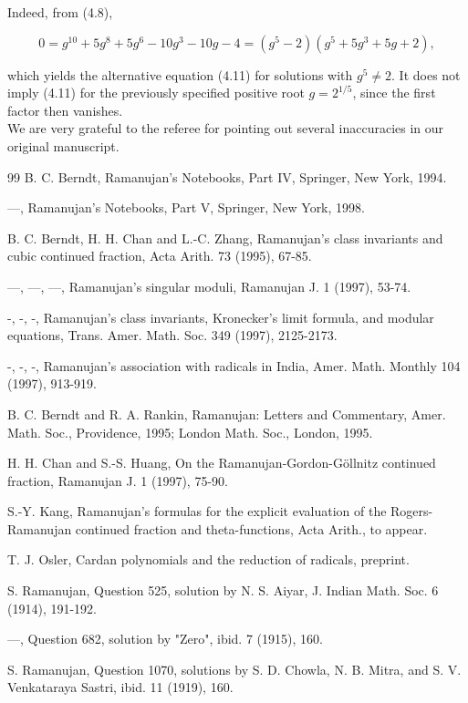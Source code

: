 \documentclass[11pt,letterpaper]{article}
\begin{document}
Indeed, from (4.8),

\[
0=g^{10}+5 g^{8}+5 g^{6}-10 g^{3}-10 g-4=\left(g^{5}-2\right)\left(g^{5}+5 g^{3}+5 g+2\right),
\]

which yields the alternative equation (4.11) for solutions with $g^5\ne2$. It does not imply (4.11) for the previously specified positive root $g=2^{1/5}$, since the first factor then vanishes.\\
We are very grateful to the referee for pointing out several inaccuracies in our original manuscript.

\begin{thebibliography}{99}
 B. C. Berndt, Ramanujan's Notebooks, Part IV, Springer, New York, 1994.

 —, Ramanujan's Notebooks, Part V, Springer, New York, 1998.

 B. C. Berndt, H. H. Chan and L.-C. Zhang, Ramanujan's class invariants and cubic continued fraction, Acta Arith. 73 (1995), 67-85.

 —, —, —, Ramanujan's singular moduli, Ramanujan J. 1 (1997), 53-74.

 -, -, -, Ramanujan's class invariants, Kronecker's limit formula, and modular equations, Trans. Amer. Math. Soc. 349 (1997), 2125-2173.

 -, -, -, Ramanujan's association with radicals in India, Amer. Math. Monthly 104 (1997), 913-919.

 B. C. Berndt and R. A. Rankin, Ramanujan: Letters and Commentary, Amer. Math. Soc., Providence, 1995; London Math. Soc., London, 1995.

 H. H. Chan and S.-S. Huang, On the Ramanujan-Gordon-Göllnitz continued fraction, Ramanujan J. 1 (1997), 75-90.

 S.-Y. Kang, Ramanujan's formulas for the explicit evaluation of the Rogers-Ramanujan continued fraction and theta-functions, Acta Arith., to appear.

 T. J. Osler, Cardan polynomials and the reduction of radicals, preprint.

 S. Ramanujan, Question 525, solution by N. S. Aiyar, J. Indian Math. Soc. 6 (1914), 191-192.

 —, Question 682, solution by "Zero", ibid. 7 (1915), 160.

 S. Ramanujan, Question 1070, solutions by S. D. Chowla, N. B. Mitra, and S. V. Venkataraya Sastri, ibid. 11 (1919), 160.


\end{thebibliography}
\end{document}
